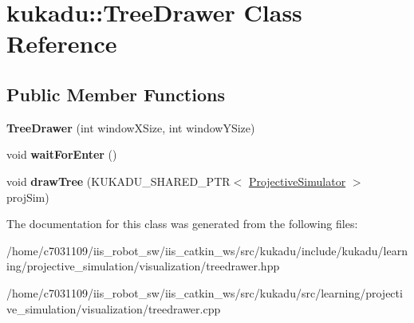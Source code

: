 \hypertarget{classkukadu_1_1TreeDrawer}{\section{kukadu\-:\-:Tree\-Drawer Class Reference}
\label{classkukadu_1_1TreeDrawer}
}
\subsection*{Public Member Functions}
\begin{DoxyCompactItemize}
\item 
\hypertarget{classkukadu_1_1TreeDrawer_acf3cd4e75efee11b5bd5cbfc0abf2274}{{\bfseries Tree\-Drawer} (int window\-X\-Size, int window\-Y\-Size)}\label{classkukadu_1_1TreeDrawer_acf3cd4e75efee11b5bd5cbfc0abf2274}

\item 
\hypertarget{classkukadu_1_1TreeDrawer_afe6018b1e9acfe71d36db95614c0860b}{void {\bfseries wait\-For\-Enter} ()}\label{classkukadu_1_1TreeDrawer_afe6018b1e9acfe71d36db95614c0860b}

\item 
\hypertarget{classkukadu_1_1TreeDrawer_a7b12348305dac91bcde4da27d0d2fa8c}{void {\bfseries draw\-Tree} (K\-U\-K\-A\-D\-U\-\_\-\-S\-H\-A\-R\-E\-D\-\_\-\-P\-T\-R$<$ \hyperlink{classkukadu_1_1ProjectiveSimulator}{Projective\-Simulator} $>$ proj\-Sim)}\label{classkukadu_1_1TreeDrawer_a7b12348305dac91bcde4da27d0d2fa8c}

\end{DoxyCompactItemize}


The documentation for this class was generated from the following files\-:\begin{DoxyCompactItemize}
\item 
/home/c7031109/iis\-\_\-robot\-\_\-sw/iis\-\_\-catkin\-\_\-ws/src/kukadu/include/kukadu/learning/projective\-\_\-simulation/visualization/treedrawer.\-hpp\item 
/home/c7031109/iis\-\_\-robot\-\_\-sw/iis\-\_\-catkin\-\_\-ws/src/kukadu/src/learning/projective\-\_\-simulation/visualization/treedrawer.\-cpp\end{DoxyCompactItemize}
